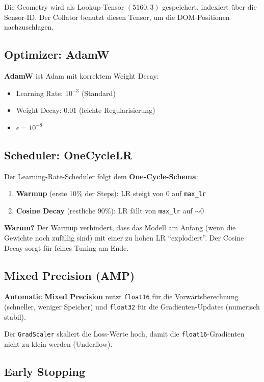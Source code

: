 \documentclass[12pt, a4paper]{article}
\begin{document}
Die Geometry wird als Lookup-Tensor $(5160, 3)$ gespeichert, indexiert
\"uber die Sensor-ID. Der Collator benutzt diesen Tensor, um die
DOM-Positionen nachzuschlagen.

\subsection{Optimizer: AdamW}

\textbf{AdamW} ist Adam mit korrektem Weight Decay:
\begin{itemize}
    \item Learning Rate: $10^{-3}$ (Standard)
    \item Weight Decay: $0.01$ (leichte Regularisierung)
    \item $\epsilon = 10^{-8}$
\end{itemize}

\subsection{Scheduler: OneCycleLR}

Der Learning-Rate-Scheduler folgt dem \textbf{One-Cycle-Schema}:
\begin{enumerate}
    \item \textbf{Warmup} (erste 10\% der Steps): LR steigt von 0 auf \texttt{max\_lr}
    \item \textbf{Cosine Decay} (restliche 90\%): LR f\"allt von \texttt{max\_lr} auf $\sim 0$
\end{enumerate}

\textbf{Warum?} Der Warmup verhindert, dass das Modell am Anfang (wenn
die Gewichte noch zuf\"allig sind) mit einer zu hohen LR ``explodiert''.
Der Cosine Decay sorgt f\"ur feines Tuning am Ende.

\subsection{Mixed Precision (AMP)}

\textbf{Automatic Mixed Precision} nutzt \texttt{float16} f\"ur die
Vorw\"artsberechnung (schneller, weniger Speicher) und \texttt{float32}
f\"ur die Gradienten-Updates (numerisch stabil).

Der \texttt{GradScaler} skaliert die Loss-Werte hoch, damit die
\texttt{float16}-Gradienten nicht zu klein werden (Underflow).

\subsection{Early Stopping}
\end{document}
